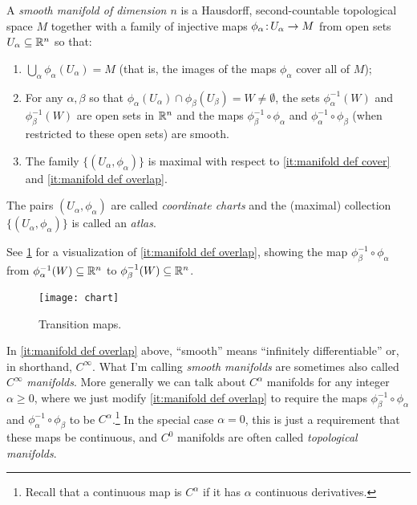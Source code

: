 \begin{definition}\label{def:manifold}
	A \emph{smooth manifold of dimension $n$} is a Hausdorff, second-countable topological space $M$ together with a family of injective maps $\phi_\alpha\colon\thinspace\!\! U_\alpha \to M$ from open sets $U_\alpha \subseteq \mathbb{R}^n$ so that:
	\begin{enumerate}
		\item \label{it:manifold def cover}$\bigcup_\alpha \phi_\alpha(U_\alpha) = M$ (that is, the images of the maps $\phi_\alpha$ cover all of $M$);
		\item \label{it:manifold def overlap}For any $\alpha, \beta$ so that $\phi_\alpha(U_\alpha) \cap \phi_\beta(U_\beta) = W \neq \emptyset$, the sets $\phi_\alpha^{-1}(W)$ and $\phi_\beta^{-1}(W)$ are open sets in $\mathbb{R}^n$ and the maps $\phi_\beta^{-1} \circ \phi_\alpha$ and $\phi_\alpha^{-1} \circ \phi_\beta$ (when restricted to these open sets) are smooth.
		\item \label{it:manifold def maximal}The family $\{(U_\alpha, \phi_\alpha)\}$ is maximal with respect to \ref{it:manifold def cover} and \ref{it:manifold def overlap}.
	\end{enumerate}
	The pairs $(U_\alpha, \phi_\alpha)$ are called \emph{coordinate charts} and the (maximal) collection $\{(U_\alpha, \phi_\alpha)\}$ is called an \emph{atlas}.	
\end{definition}

See \cref{fig:chart} for a visualization of \ref{it:manifold def overlap}, showing the map $\phi_\beta^{-1} \circ \phi_\alpha$ from $\phi_\alpha^{-1}(W) \subseteq \mathbb{R}^n$ to $\phi_\beta^{-1}(W) \subseteq \mathbb{R}^n$.

\begin{figure}[htbp]
	\centering
		\texttt{[image: chart]}
	\caption{Transition maps.}
	\label{fig:chart}
\end{figure}

\begin{remark}
	In \ref{it:manifold def overlap} above, ``smooth'' means ``infinitely differentiable'' or, in shorthand, $C^\infty$. What I'm calling \emph{smooth manifolds} are sometimes also called $C^\infty$ \emph{manifolds}. More generally we can talk about $C^\alpha$ manifolds for any integer $\alpha \geq 0$, where we just modify \ref{it:manifold def overlap} to require the maps $\phi_\beta^{-1} \circ \phi_\alpha$ and $\phi_\alpha^{-1} \circ \phi_\beta$ to be $C^\alpha$.\footnote{Recall that a continuous map is $C^\alpha$ if it has $\alpha$ continuous derivatives.} In the special case $\alpha = 0$, this is just a requirement that these maps be continuous, and $C^0$ manifolds are often called \emph{topological manifolds}.
\end{remark}

